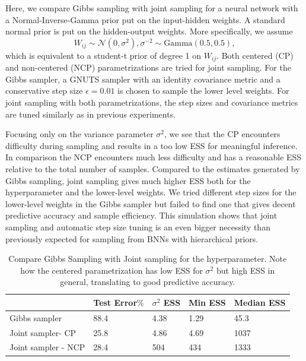 \documentclass[12pt]{report}
\begin{document}
Here, we compare Gibbs sampling with joint sampling for a neural network with a Normal-Inverse-Gamma prior put on the input-hidden weights. A standard normal prior is put on the hidden-output weights. More specifically, we assume 
\[W_{ij} \sim \mathcal{N}(0,\sigma^2), \sigma^{-2} \sim \text{Gamma}(0.5,0.5), \]
which is equivalent to a student-t prior of degree 1 on $W_{ij}$. Both centered (CP) and non-centered (NCP) parametrizations are tried for joint sampling. For the Gibbs sampler, a GNUTS sampler with an identity covariance metric and a conservative step size $\epsilon = 0.01$ is chosen to sample the lower level weights. For joint sampling with both parametrizations, the step sizes and covariance metrics are tuned similarly as in previous experiments.

Focusing only on the variance parameter $\sigma^2$, we see that the CP encounters difficulty during sampling and results in a too low ESS for meaningful inference. In comparison the NCP encounters much less difficulty and has a reasonable ESS relative to the total number of samples. Compared to the  estimates generated by Gibbs sampling, joint sampling gives much higher ESS both for the hyperparameter and the lower-level weights. We tried different step sizes for the lower-level weights in the Gibbs sampler but failed to find one that gives decent predictive accuracy and sample efficiency. This simulation shows that joint sampling and automatic step size tuning is an even bigger necessity than previously expected for sampling from BNNs with hierarchical priors.

\begin{table}[]
\centering
\begin{tabular}{@{}lllll@{}}
\toprule
              & Test Error$\%$ & $\sigma^2$ ESS & Min ESS & Median ESS \\ \midrule
Gibbs sampler & 88.4        & 4.38         & 1.29      & 45.3       \\ \midrule
Joint sampler- CP     & 25.8      & 4.86       & 4.69     & 1037         \\ \midrule
Joint sampler - NCP   & 28.4      & 504         & 434     & 1333        \\ \bottomrule
\end{tabular}
\caption{Compare Gibbs Sampling with Joint sampling for the hyperparameter. Note how the centered parametrization has low ESS for $\sigma^2 $ but high ESS in general, translating to good predictive accuracy. }
\label{my-label}
\end{table}
\end{document}
